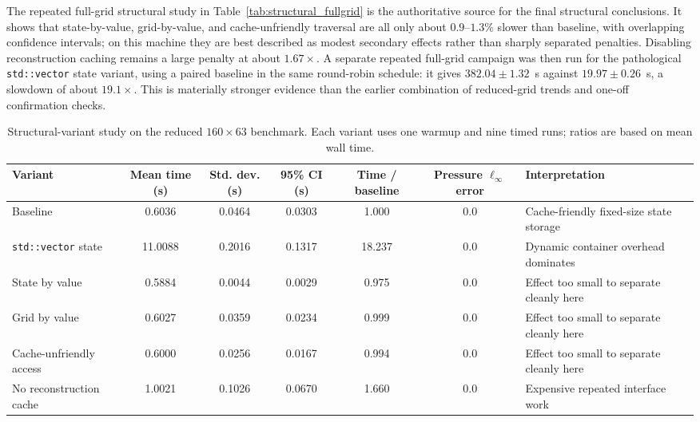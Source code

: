 \documentclass[final,3p,times,twocolumn]{elsarticle}
\begin{document}
The repeated full-grid structural study in Table~\ref{tab:structural_fullgrid} is the authoritative source for the final structural conclusions. It shows that state-by-value, grid-by-value, and cache-unfriendly traversal are all only about $0.9$--$1.3\%$ slower than baseline, with overlapping confidence intervals; on this machine they are best described as modest secondary effects rather than sharply separated penalties. Disabling reconstruction caching remains a large penalty at about $1.67\times$. A separate repeated full-grid campaign was then run for the pathological \texttt{std::vector} state variant, using a paired baseline in the same round-robin schedule: it gives $382.04 \pm 1.32$~s against $19.97 \pm 0.26$~s, a slowdown of about $19.1\times$. This is materially stronger evidence than the earlier combination of reduced-grid trends and one-off confirmation checks.

\begin{table}[t]
\centering
\caption{Structural-variant study on the reduced $160 \times 63$ benchmark. Each variant uses one warmup and nine timed runs; ratios are based on mean wall time.}
\label{tab:structural}
\small
\setlength{\tabcolsep}{4pt}
\begin{tabular}{>{\raggedright\arraybackslash}p{3.1cm}ccccc>{\raggedright\arraybackslash}p{3.8cm}}
\toprule
Variant & Mean time (s) & Std. dev. (s) & 95\% CI (s) & Time / baseline & Pressure $\ell_\infty$ error & Interpretation \\
\midrule
Baseline & 0.6036 & 0.0464 & 0.0303 & 1.000 & 0.0 & Cache-friendly fixed-size state storage \\
\texttt{std::vector} state & 11.0088 & 0.2016 & 0.1317 & 18.237 & 0.0 & Dynamic container overhead dominates \\
State by value & 0.5884 & 0.0044 & 0.0029 & 0.975 & 0.0 & Effect too small to separate cleanly here \\
Grid by value & 0.6027 & 0.0359 & 0.0234 & 0.999 & 0.0 & Effect too small to separate cleanly here \\
Cache-unfriendly access & 0.6000 & 0.0256 & 0.0167 & 0.994 & 0.0 & Effect too small to separate cleanly here \\
No reconstruction cache & 1.0021 & 0.1026 & 0.0670 & 1.660 & 0.0 & Expensive repeated interface work \\
\bottomrule
\end{tabular}
\normalsize
\end{table}
\end{document}
